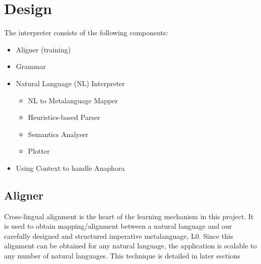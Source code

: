 \def\DevnagVersion{2.15}\documentclass[12pt]{article}
\begin{document}
% 
% 
% 
% 

\section{Design}
The interpreter consists of the following components:
\begin{itemize}
\item Aligner (training)
\item Grammar
\item Natural Language (NL) Interpreter
  \begin{itemize}
    \item NL to Metalanguage Mapper
    \item Heuristics-based Parser
    \item Semantics Analyser
    \item Plotter  
  \end{itemize}
\item Using Context to handle Anaphora
\end{itemize}

\subsection{Aligner}
Cross-lingual alignment is the heart of the learning mechanism in this project. It is used to obtain mapping/alignment between a natural language and our carefully designed and structured imperative metalanguage, L0. Since this alignment can be obtained for any natural language, the application is scalable to any number of natural languages. This technique is detailed in later sections\\
\end{document}
